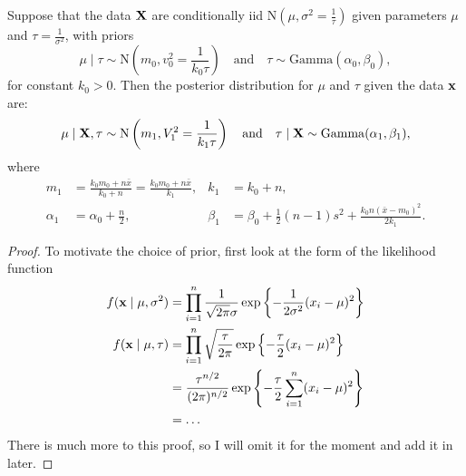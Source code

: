 \documentclass[10pt, a4paper]{article}
\begin{document}
\begin{theorem}
    Suppose that the data $\mathbf{X}$ are conditionally iid $\mathrm{N}(\mu, \sigma ^ 2 = \frac{1}{\tau})$ given parameters $\mu$ and $\tau = \frac{1}{\sigma ^ 2}$,
    with priors
    \[
    \mu \mid \tau \sim \mathrm{N}\left(m_0, v_0 ^ 2 = \frac{1}{k_0\tau}\right)\quad\text{and}\quad\tau \sim \mathrm{Gamma}(\alpha_0, \beta_0),
    \]
    for constant $k_0 > 0$.
    Then the posterior distribution for $\mu$ and $\tau$ given the data $\mathbf{x}$ are:
    \[
    \mu \mid \mathbf{X}, \tau \sim \mathrm{N}\left(m_1, V_1 ^ 2 = \frac{1}{k_1\tau}\right)\quad\text{and}\quad\tau \mid \mathbf{X} \sim \mathrm{Gamma}(\alpha_1, \beta_1),
    \]
    where
    \begin{align*}
        m_1 &= \frac{k_0m_0 + n\bar{x}}{k_0 + n} = \frac{k_0m_0 + n\bar{x}}{k_1},& k_1 &= k_0 + n, \\
        \alpha_1 &= \alpha_0 + \frac{n}{2},& \beta_1 &= \beta_0 + \frac{1}{2}(n - 1)s ^ 2 + \frac{k_0n(\bar{x} - m_0) ^ 2}{2k_1}.
    \end{align*}

    \begin{proof}
        To motivate the choice of prior,
        first look at the form of the likelihood function
        \begin{align*}
            f(\mathbf{x} \mid \mu, \sigma ^ 2) &= \prod_{i = 1}^{n}\frac{1}{\sqrt{2\pi}\sigma}\exp\left\{-\frac{1}{2\sigma ^ 2}(x_i - \mu) ^ 2\right\} \\
            f(\mathbf{x} \mid \mu, \tau) &= \prod_{i = 1}^{n}\sqrt{\frac{\tau}{2\pi}}\exp\left\{-\frac{\tau}{2}(x_i - \mu) ^ 2\right\} \\
            &= \frac{\tau ^ {n / 2}}{(2\pi) ^ {n / 2}}\exp\left\{-\frac{\tau}{2}\sum_{i = 1}^{n}(x_i - \mu) ^ 2\right\} \\
            &=\dotsc
        \end{align*}
        There is much more to this proof,
        so I will omit it for the moment and add it in later.
    \end{proof}
\end{theorem}
\end{document}

